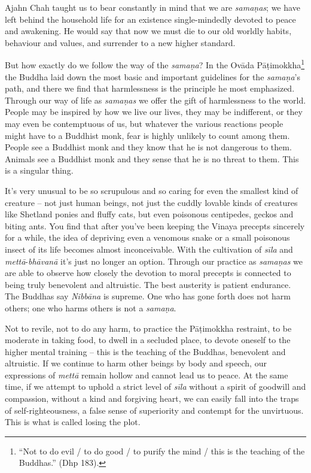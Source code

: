 
Ajahn Chah taught us to bear constantly in mind that we are
\emph{samaṇas}; we have left behind the household life for an existence
single-mindedly devoted to peace and awakening. He would say that now we
must die to our old worldly habits, behaviour and values, and surrender
to a new higher standard. 

But how exactly do we follow the way of the \emph{samaṇa}? In the
Ovāda Pāṭimokkha\footnote{``Not to do evil / to do good / to purify
the mind / this is the teaching of the Buddhas.'' (Dhp 183).} the Buddha laid
down the most basic and important guidelines for the \emph{samaṇa}'s
path, and there we find that harmlessness is the principle he most
emphasized. Through our way of life as \emph{samaṇas} we offer the gift
of harmlessness to the world. People may be inspired by how we live our
lives, they may be indifferent, or they may even be contemptuous of us, 
but whatever the various reactions people might have to a Buddhist monk, 
fear is highly unlikely to count among them. People see a Buddhist monk
and they know that he is not dangerous to them. Animals see a Buddhist
monk and they sense that he is no threat to them. This is a singular
thing. 

It's very unusual to be so scrupulous and so caring for even the
smallest kind of creature -- not just human beings, not just the cuddly
lovable kinds of creatures like Shetland ponies and fluffy cats, but
even poisonous centipedes, geckos and biting ants. You find that after
you've been keeping the Vinaya precepts sincerely for a while, the idea
of depriving even a venomous snake or a small poisonous insect of its
life becomes almost inconceivable. With the cultivation of \emph{sīla}
and \emph{mettā}-\emph{bhāvanā} it's just no longer an option. Through
our practice as \emph{samaṇas} we are able to observe how closely the
devotion to moral precepts is connected to being truly benevolent and
altruistic. The best austerity is patient endurance. The Buddhas say
\emph{Nibbāna} is supreme. One who has gone forth does not harm others; 
one who harms others is not a \emph{samaṇa}. 

Not to revile, not to do any harm, to practice the Pāṭimokkha restraint, 
to be moderate in taking food, to dwell in a secluded place, to devote
oneself to the higher mental training -- this is the teaching of the
Buddhas, benevolent and altruistic. If we continue to harm other beings
by body and speech, our expressions of \emph{mettā} remain hollow and
cannot lead us to peace. At the same time, if we attempt to uphold a
strict level of \emph{sīla} without a spirit of goodwill and compassion, 
without a kind and forgiving heart, we can easily fall into the traps of
self-righteousness, a false sense of superiority and contempt for the
unvirtuous. This is what is called losing the plot. 


